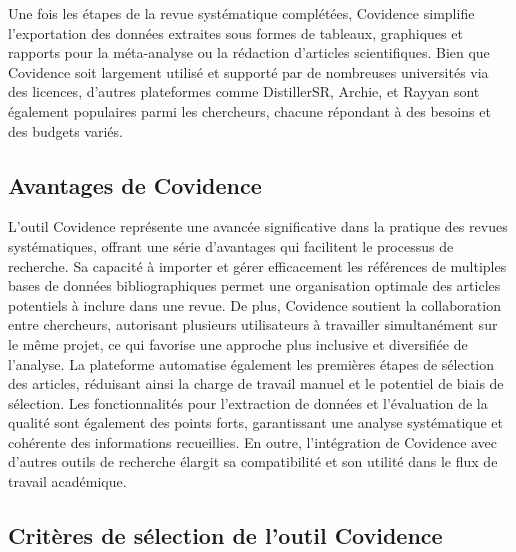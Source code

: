 \documentclass[
  letterpaper,
  DIV=11,
  numbers=noendperiod]{scrreprt}
\begin{document}
Une fois les étapes de la revue systématique complétées, Covidence
simplifie l'exportation des données extraites sous formes de tableaux,
graphiques et rapports pour la méta-analyse ou la rédaction d'articles
scientifiques. Bien que Covidence soit largement utilisé et supporté par
de nombreuses universités via des licences, d'autres plateformes comme
DistillerSR, Archie, et Rayyan sont également populaires parmi les
chercheurs, chacune répondant à des besoins et des budgets variés.

\subsection{Avantages de Covidence}\label{avantages-de-covidence}

L'outil Covidence représente une avancée significative dans la pratique
des revues systématiques, offrant une série d'avantages qui facilitent
le processus de recherche. Sa capacité à importer et gérer efficacement
les références de multiples bases de données bibliographiques permet une
organisation optimale des articles potentiels à inclure dans une revue.
De plus, Covidence soutient la collaboration entre chercheurs,
autorisant plusieurs utilisateurs à travailler simultanément sur le même
projet, ce qui favorise une approche plus inclusive et diversifiée de
l'analyse. La plateforme automatise également les premières étapes de
sélection des articles, réduisant ainsi la charge de travail manuel et
le potentiel de biais de sélection. Les fonctionnalités pour
l'extraction de données et l'évaluation de la qualité sont également des
points forts, garantissant une analyse systématique et cohérente des
informations recueillies. En outre, l'intégration de Covidence avec
d'autres outils de recherche élargit sa compatibilité et son utilité
dans le flux de travail académique.

\subsection{Critères de sélection de l'outil
Covidence}\label{crituxe8res-de-suxe9lection-de-loutil-covidence}
\end{document}
